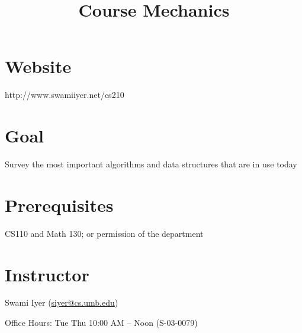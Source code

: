 \documentclass[8pt,a4paper,compress]{beamer}
\title{Course Mechanics}
\date{}
\begin{document}
\begin{frame}
\vfill
\titlepage
\end{frame}

\section{Website}
\begin{frame}[fragile]
\pause

http://www.swamiiyer.net/cs210
\end{frame}

\section{Goal}
\begin{frame}[fragile]
\pause

Survey the most important algorithms and data structures that are in use today
\end{frame}

\section{Prerequisites}
\begin{frame}[fragile]
\pause

CS110 and Math 130; or permission of the department
\end{frame}

\section{Instructor}
\begin{frame}[fragile]
\pause

Swami Iyer (\href{siyer@cs.umb.edu}{siyer@cs.umb.edu})

\pause\bigskip

Office Hours: Tue Thu 10:00 AM -- Noon (S-03-0079)
\end{frame}
\end{document}
